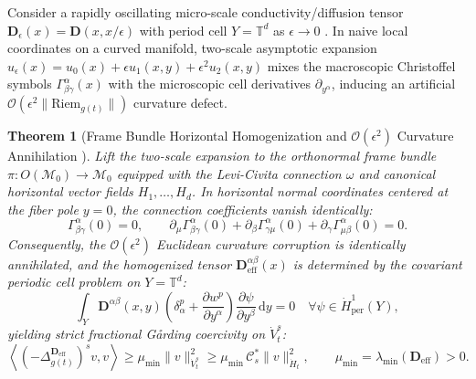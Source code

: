 \documentclass[11pt,a4paper,reqno]{article}
\newtheorem{theorem}{Theorem}[section]
\theoremstyle{definition}
\theoremstyle{remark}
\begin{document}
Consider a rapidly oscillating micro-scale conductivity/diffusion tensor $\mathbf{D}_\epsilon(x) = \mathbf{D}(x, x/\epsilon)$ with period cell $Y = \mathbb{T}^d$ as $\epsilon \to 0$ \cite{bensoussan2011asymptotic, jikov2012homogenization}. In naive local coordinates on a curved manifold, two-scale asymptotic expansion $u_\epsilon(x) = u_0(x) + \epsilon u_1(x, y) + \epsilon^2 u_2(x, y)$ mixes the macroscopic Christoffel symbols $\Gamma_{\beta\gamma}^\alpha(x)$ with the microscopic cell derivatives $\partial_{y^\alpha}$, inducing an artificial $\mathcal{O}(\epsilon^2 \|\mathrm{Riem}_{g(t)}\|)$ curvature defect.

\begin{theorem}[Frame Bundle Horizontal Homogenization and $\mathcal{O}(\epsilon^2)$ Curvature Annihilation \cite{ananda2026stochastic_fluid_v2, hsu2002stochastic}]\label{thm:frame_bundle_homog}
Lift the two-scale expansion to the orthonormal frame bundle $\pi : O(\mathcal{M}_0) \to \mathcal{M}_0$ equipped with the Levi-Civita connection $\omega$ and canonical horizontal vector fields $H_1, \dots, H_d$. In horizontal normal coordinates centered at the fiber pole $y = 0$, the connection coefficients vanish identically:
\begin{equation}\label{eq:christoffel_pole_zero}
  \Gamma_{\beta\gamma}^\alpha(0) = 0, \qquad \partial_\mu \Gamma_{\beta\gamma}^\alpha(0) + \partial_\beta \Gamma_{\gamma\mu}^\alpha(0) + \partial_\gamma \Gamma_{\mu\beta}^\alpha(0) = 0.
\end{equation}
Consequently, the $\mathcal{O}(\epsilon^2)$ Euclidean curvature corruption is identically annihilated, and the homogenized tensor $\mathbf{D}_{\mathrm{eff}}^{\alpha\beta}(x)$ is determined by the covariant periodic cell problem on $Y = \mathbb{T}^d$:
\begin{equation}\label{eq:cell_problem}
  \int_{Y} \mathbf{D}^{\alpha\beta}(x, y) \left( \delta_\alpha^p + \frac{\partial w^p}{\partial y^\alpha} \right) \frac{\partial \psi}{\partial y^\beta} \,\mathrm{d}y = 0 \quad \forall \psi \in \dot{H}_{\mathrm{per}}^1(Y),
\end{equation}
yielding strict fractional G\aa rding coercivity on $\dot{V}_t^s$:
\begin{equation}\label{eq:garding_coercivity}
  \left\langle (-\Delta_{g(t)}^{\mathbf{D}_{\mathrm{eff}}})^s v, v \right\rangle \ge \mu_{\min} \|v\|_{\dot{V}_t^s}^2 \ge \mu_{\min}\,\mathcal{C}_s^* \|v\|_{\dot{H}_t}^2, \qquad \mu_{\min} = \lambda_{\min}(\mathbf{D}_{\mathrm{eff}}) > 0.
\end{equation}
\end{theorem}
\end{document}
